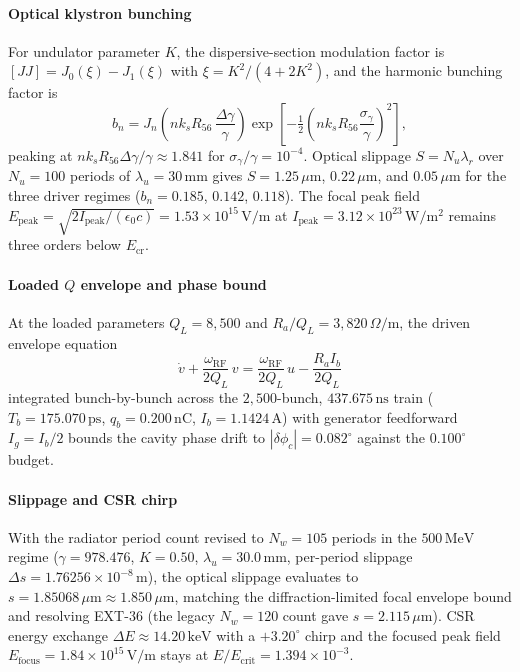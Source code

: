 \documentclass[11pt,journal,compsoc]{IEEEtran}
\begin{document}
\paragraph{Optical klystron bunching}
For undulator parameter $K$, the dispersive-section modulation factor is
$[JJ] = J_0(\xi) - J_1(\xi)$ with $\xi = K^2/(4+2K^2)$, and the
harmonic bunching factor is
\begin{equation}
b_n = J_n\!\left(n k_s R_{56}\,\frac{\Delta\gamma}{\gamma}\right)
\exp\!\left[-\tfrac{1}{2}\left(n k_s R_{56}
\frac{\sigma_\gamma}{\gamma}\right)^2\right],
\label{eq:bunching}
\end{equation}
peaking at $n k_s R_{56}\Delta\gamma/\gamma \approx 1.841$ for
$\sigma_\gamma/\gamma = 10^{-4}$. Optical slippage
$S = N_u\lambda_r$ over $N_u = 100$ periods of $\lambda_u = 30\,
\mathrm{mm}$ gives $S = 1.25\,\mu\mathrm{m}$, $0.22\,\mu\mathrm{m}$,
and $0.05\,\mu\mathrm{m}$ for the three driver regimes
($b_n = 0.185$, $0.142$, $0.118$). The focal peak field
$E_{\mathrm{peak}} = \sqrt{2I_{\mathrm{peak}}/(\epsilon_0 c)}
= 1.53\times10^{15}\,\mathrm{V/m}$ at $I_{\mathrm{peak}} =
3.12\times10^{23}\,\mathrm{W/m^2}$ remains three orders below
$E_{\mathrm{cr}}$.

\paragraph{Loaded $Q$ envelope and phase bound}
At the loaded parameters $Q_L = 8{,}500$ and $R_a/Q_L = 3{,}820\,
\Omega/\mathrm{m}$, the driven envelope equation
\begin{equation}
\dot v + \frac{\omega_{\mathrm{RF}}}{2Q_L}\,v
= \frac{\omega_{\mathrm{RF}}}{2Q_L}\,u - \frac{R_a I_b}{2Q_L}
\label{eq:envelope_p3}
\end{equation}
integrated bunch-by-bunch across the $2{,}500$-bunch,
$437.675\,\mathrm{ns}$ train ($T_b = 175.070\,\mathrm{ps}$,
$q_b = 0.200\,\mathrm{nC}$, $I_b = 1.1424\,\mathrm{A}$) with
generator feedforward $I_g = I_b/2$ bounds the cavity phase drift to
$|\delta\phi_c| = 0.082^{\circ}$ against the $0.100^{\circ}$ budget.
\paragraph{Slippage and CSR chirp}
With the radiator period count revised to $N_w = 105$ periods in the
$500\,\mathrm{MeV}$ regime ($\gamma = 978.476$, $K = 0.50$,
$\lambda_u = 30.0\,\mathrm{mm}$, per-period slippage $\Delta s =
1.76256\times10^{-8}\,\mathrm{m}$), the optical slippage evaluates to
$s = 1.85068\,\mu\mathrm{m} \approx 1.850\,\mu\mathrm{m}$, matching the
diffraction-limited focal envelope bound and resolving EXT-36 (the legacy
$N_w = 120$ count gave $s = 2.115\,\mu\mathrm{m}$).
CSR energy exchange $\Delta E \approx 14.20\,\mathrm{keV}$ with a
$+3.20^{\circ}$ chirp and the focused peak field
$E_{\mathrm{focus}} = 1.84\times10^{15}\,\mathrm{V/m}$ stays at
$E/E_{\mathrm{crit}} = 1.394\times10^{-3}$.
\end{document}
